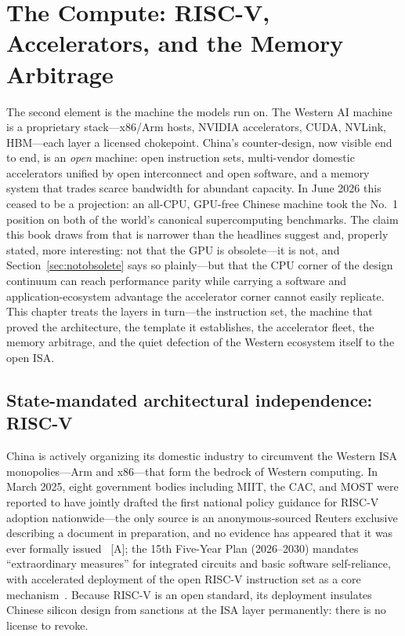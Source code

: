 \chapter[The Compute: RISC-V, Accelerators, and the Memory Arbitrage]{The Compute: RISC-V, Accelerators, and the Memory Arbitrage}
\label{ch:compute}

The second element is the machine the models run on. The Western AI machine is a proprietary stack---x86/Arm hosts, NVIDIA accelerators, CUDA, NVLink, HBM---each layer a licensed chokepoint. China's counter-design, now visible end to end, is an \emph{open} machine: open instruction sets, multi-vendor domestic accelerators unified by open interconnect and open software, and a memory system that trades scarce bandwidth for abundant capacity. In June 2026 this ceased to be a projection: an all-CPU, GPU-free Chinese machine took the No.~1 position on both of the world's canonical supercomputing benchmarks. The claim this book draws from that is narrower than the headlines suggest and, properly stated, more interesting: not that the GPU is obsolete---it is not, and Section~\ref{sec:notobsolete} says so plainly---but that the CPU corner of the design continuum can reach performance parity while carrying a software and application-ecosystem advantage the accelerator corner cannot easily replicate. This chapter treats the layers in turn---the instruction set, the machine that proved the architecture, the template it establishes, the accelerator fleet, the memory arbitrage, and the quiet defection of the Western ecosystem itself to the open ISA.

\section{State-mandated architectural independence: RISC-V}
\label{sec:riscv}

China is actively organizing its domestic industry to circumvent the Western ISA monopolies---Arm and x86---that form the bedrock of Western computing. In March 2025, eight government bodies including MIIT, the CAC, and MOST were reported to have jointly drafted the first national policy guidance for RISC-V adoption nationwide---the only source is an anonymous-sourced Reuters exclusive describing a document in preparation, and no evidence has appeared that it was ever formally issued~\cite{riscv-policy} [A]; the 15th Five-Year Plan (2026--2030) mandates ``extraordinary measures'' for integrated circuits and basic software self-reliance, with accelerated deployment of the open RISC-V instruction set as a core mechanism~\cite{fyp15}. Because RISC-V is an open standard, its deployment insulates Chinese silicon design from sanctions at the ISA layer permanently: there is no license to revoke.

